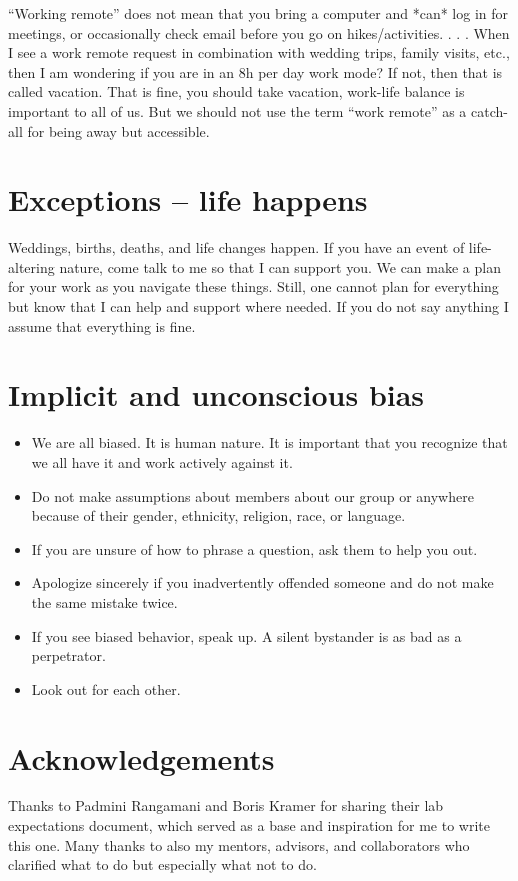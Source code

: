 \documentclass[12pt]{article}
\begin{document}
``Working remote'' does not mean that you bring a computer and *can* log in for meetings, or occasionally check email before you go on hikes/activities. . . .
When I see a work remote request in combination with wedding trips, family visits, etc., then I am wondering if you are in an 8h per day work mode?
If not, then that is called vacation.
That is fine, you should take vacation, work-life balance is important to all of us.
But we should not use the term ``work remote'' as a catch-all for being away but accessible.

\section{Exceptions -- life happens}
Weddings, births, deaths, and life changes happen.
If you have an event of life-altering nature, come talk to me so that I can support you.
We can make a plan for your work as you navigate these things.
Still, one cannot plan for everything but know that I can help and support where needed.
If you do not say anything I assume that everything is fine.

\section{Implicit and unconscious bias}
\begin{itemize}
  \item We are all biased.
        It is human nature.
        It is important that you recognize that we all have it and work actively against it.
  \item Do not make assumptions about members about our group or anywhere because of their gender, ethnicity, religion, race, or language.
  \item If you are unsure of how to phrase a question, ask them to help you out.
  \item Apologize sincerely if you inadvertently offended someone and do not make the same mistake twice.
  \item If you see biased behavior, speak up.
        A silent bystander is as bad as a perpetrator.
  \item Look out for each other.
\end{itemize}

\section{Acknowledgements}
Thanks to Padmini Rangamani and Boris Kramer for sharing their lab expectations document, which served as a base and inspiration for me to write this one.
Many thanks to also my mentors, advisors, and collaborators who clarified what to do but especially what not to do.
\end{document}
